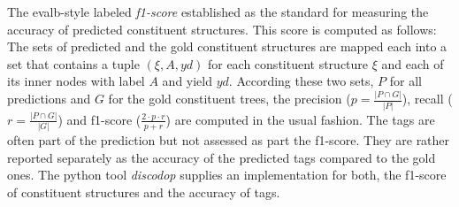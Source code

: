 \documentclass[../document.tex]{subfiles}
\begin{document}
    The evalb-style labeled \emph{f1-score} \citep{Black91,Col97} established as the standard for measuring the accuracy of predicted constituent structures.
    This score is computed as follows:
    The sets of predicted and the gold constituent structures are mapped each into a set that contains a tuple \((\xi, A, \mathit{yd})\) for each constituent structure \(\xi\) and each of its inner nodes with label \(A\) and yield \(\mathit{yd}\).
    According these two sets, \(P\) for all predictions and \(G\) for the gold constituent trees, the precision (\(p = \frac{|P \cap G|}{|P|}\)), recall (\(r = \frac{|P \cap G|}{|G|}\)) and f1-score (\(\frac{2\cdot p\cdot r}{p + r}\)) are computed in the usual fashion.
    The  tags are often part of the prediction but not assessed as part the f1-score.
    They are rather reported separately as the accuracy of the predicted  tags compared to the gold ones.
    The python tool \emph{discodop} supplies an implementation for both, the f1-score of constituent structures and the accuracy of  tags. \citep{CraSchBod16}
\end{document}
